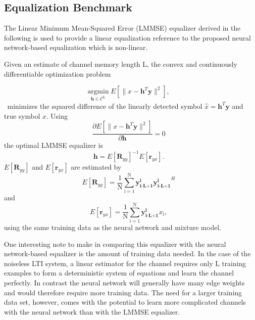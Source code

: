 \subsection{Equalization Benchmark}\label{LMMSE}
The Linear Minimum Mean-Squared Error (LMMSE) equalizer derived in the following is used to provide a linear equalization reference to the proposed neural network-based equalization which is non-linear.
\par
Given an estimate of channel memory length L, the convex and continuously differentiable optimization problem 

\begin{equation*}\label{mmse}
\underset{\mathbf{\mathbf{h}} \in \textit{$\mathcal{C}^{\text{L}}$}}{\text{argmin}} \;
 E[\|x-\mathbf{h}^T\mathbf{y}\|^2],
\end{equation*}\
minimizes the squared difference of the linearly detected symbol $\hat{x}= \mathbf{h}^T\mathbf{y}$ and true symbol $x$.
Using
\begin{equation*}\label{mmse}
\frac{\partial  E[\|x-\mathbf{h}^T\mathbf{y}\|^2]}{\partial \mathbf{h} } = 0
\end{equation*}
the optimal LMMSE equalizer is \cite{proakis1988introduction}
\begin{equation*}\label{mmse}
\mathbf{h} = E[\mathbf{R}_{yy}]^{-1}E[\mathbf{r}_{yx}].
\end{equation*}
$E[\mathbf{R}_{yy}]$ and $E[\mathbf{r}_{yx}]$ are estimated by
\begin{equation*}\label{mmse}
 E[\mathbf{R}_{yy}]= \frac{1}{\mathrm{N}}\sum_{\mathrm{i=1}}^{\mathrm{N}}
\mathbf{y^{\text{i}}_{\text{i-L+1}}}\mathbf{y^{\text{i}}_{\text{i-L+1}}}^H
 \end{equation*}
 and
\begin{equation*}\label{mmse}
E[\mathbf{r}_{yx}]= \frac{1}{\mathrm{N}}\sum_{\mathrm{i=1}}^{\mathrm{N}}
\mathbf{y^{\text{i}}_{\text{i-L+1}}}x_{\text{i}},
 \end{equation*}
 using the same training data as the neural network and mixture model. 
 
\par
One interesting note to make in comparing this equalizer with the neural network-based equalizer is the amount of training data needed. In the case of the noiseless LTI system, a linear estimator for the channel requires only L training examples to form a deterministic system of equations and learn the channel perfectly. In contrast the neural network will generally have many edge weights and would therefore require more training data. The need for a larger training data set, however, comes with the potential to learn more complicated channels with the neural network than with the LMMSE equalizer.
 
